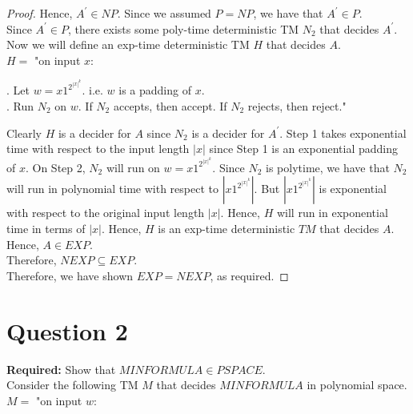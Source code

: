 \documentclass[12pt]{article}
\begin{document}
\begin{proof}
Hence, $A^\prime \in NP$. Since we assumed $P = NP$, we have that $A^\prime \in P$. \\

Since $A^\prime \in P$, there exists some poly-time deterministic TM $N_2$ that decides $A^\prime$. \\

Now we will define an exp-time deterministic TM $H$ that decides $A$. \\

$H = $ "on input $x$: \\

\setlength\parindent{15pt}

. Let $w = x1^{2^{|x|^k}}$. i.e. $w$ is a padding of $x$. \\

. Run $N_2$ on $w$. If $N_2$ accepts, then accept. If $N_2$ rejects, then reject." \\
\setlength\parindent{0pt}

Clearly $H$ is a decider for $A$ since $N_2$ is a decider for $A^\prime$. Step 1 takes exponential time with respect to the input length $|x|$ since Step 1 is an exponential padding of $x$. On Step 2, $N_2$ will run on $w = x1^{2^{|x|^k}}$. Since $N_2$ is polytime, we have that $N_2$ will run in polynomial time with respect to $|x1^{2^{|x|^k}}|$. But $|x1^{2^{|x|^k}}|$ is exponential with respect to the original input length $|x|$. Hence, $H$ will run in exponential time in terms of $|x|$. Hence, $H$ is an exp-time deterministic $TM$ that decides $A$. Hence, $A \in EXP$. \\

Therefore, $NEXP \subseteq EXP$. \\

Therefore, we have shown $EXP = NEXP$, as required. 
\end{proof}


\newpage

\section*{Question 2}

\textbf{Required:} Show that $MINFORMULA \in PSPACE$. \\

Consider the following TM $M$ that decides $MINFORMULA$ in polynomial space. \\

$M = $ "on input $w$: \\
\end{document}
